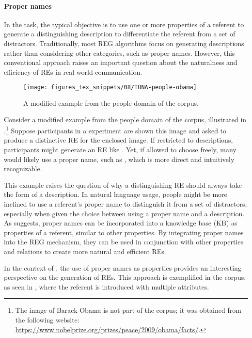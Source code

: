\paragraph*{Proper names}

In the \shot task, the typical objective is to use one or more properties of a referent to generate a distinguishing description to differentiate the referent from a set of distractors. Traditionally, most REG algorithms focus on generating descriptions rather than considering other categories, such as proper names. However, this conventional approach raises an important question about the naturalness and efficiency of REs in real-world communication.

\begin{figure}
	\texttt{[image: figures\_tex\_snippets/08/TUNA-people-obama]}
	\caption{A modified example from the people domain of the  corpus.}
	\label{fig:tuna-people-obama}
\end{figure}

Consider a modified example from the people domain of the  corpus, illustrated in .\footnote{The image of Barack Obama is not part of the  corpus; it was obtained from the following website: \url{https://www.nobelprize.org/prizes/peace/2009/obama/facts/}.} Suppose participants in a \shot experiment are shown this image and asked to produce a distinctive RE for the enclosed image. If restricted to descriptions, participants might generate an RE like . Yet, if allowed to choose freely, many would likely use a proper name, such as , which is more direct and intuitively recognizable.


This example raises the question of why a distinguishing RE should always take the form of a description. In natural language usage, people might be more inclined to use a referent's proper name to distinguish it from a set of distractors, especially when given the choice between using a proper name and a description. As \citet{van2016computational} suggests, proper names can be incorporated into a knowledge base (KB) as properties of a referent, similar to other properties. By integrating proper names into the REG mechanism, they can be used in conjunction with other properties and relations to create more natural and efficient REs.

In the context of \context, the use of proper names as properties provides an interesting perspective on the generation of REs. This approach is exemplified in the \wsj corpus, as seen in , where the referent  is introduced with multiple attributes.

